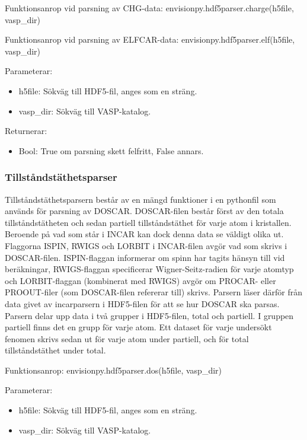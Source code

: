 \documentclass[10pt,oneside,swedish]{article}
\providecommand{\tightlist}{%
  \setlength{\itemsep}{0pt}\setlength{\parskip}{0pt}}
\begin{document}
Funktionsanrop vid parsning av CHG-data:
envisionpy.hdf5parser.charge(h5file, vasp\_dir)

Funktionsanrop vid parsning av ELFCAR-data:
envisionpy.hdf5parser.elf(h5file, vasp\_dir)

Parameterar:

\begin{itemize}
\tightlist
\item
  h5file: Sökväg till HDF5-fil, anges som en sträng.
\item
  vasp\_dir: Sökväg till VASP-katalog.
\end{itemize}

Returnerar:

\begin{itemize}
\tightlist
\item
  Bool: True om parsning skett felfritt, False annars.
\end{itemize}

\subsubsection{Tillståndstäthetsparser}\label{tillstuxe5ndstuxe4thetsparser}

Tillståndstäthetsparsern består av en mängd funktioner i en pythonfil
som används för parsning av DOSCAR. DOSCAR-filen består först av den
totala tillståndstätheten och sedan partiell tillståndstäthet för varje
atom i kristallen. Beroende på vad som står i INCAR kan dock denna data
se väldigt olika ut. Flaggorna ISPIN, RWIGS och LORBIT i INCAR-filen
avgör vad som skrivs i DOSCAR-filen. ISPIN-flaggan informerar om spinn
har tagits hänsyn till vid beräkningar, RWIGS-flaggan specificerar
Wigner-Seitz-radien för varje atomtyp och LORBIT-flaggan (kombinerat med
RWIGS) avgör om PROCAR- eller PROOUT-filer (som DOSCAR-filen refererar
till) skrivs. Parsern läser därför från data givet av incarparsern i
HDF5-filen för att se hur DOSCAR ska parsas. Parsern delar upp data i
två grupper i HDF5-filen, total och partiell. I gruppen partiell finns
det en grupp för varje atom. Ett dataset för varje undersökt fenomen
skrivs sedan ut för varje atom under partiell, och för total
tillståndstäthet under total.

Funktionsanrop: envisionpy.hdf5parser.dos(h5file, vasp\_dir)

Parameterar:

\begin{itemize}
\tightlist
\item
  h5file: Sökväg till HDF5-fil, anges som en sträng.
\item
  vasp\_dir: Sökväg till VASP-katalog.
\end{itemize}
\end{document}
